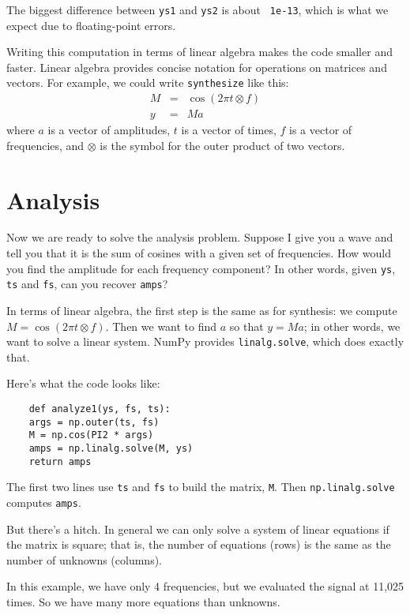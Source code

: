 The biggest difference between {\tt ys1} and {\tt ys2} is about {\tt
	1e-13}, which is what we expect due to floating-point errors.

Writing this computation in terms of linear algebra makes the code
smaller and faster.  Linear algebra
provides concise notation for operations on matrices and vectors.  For
example, we could write {\tt synthesize} like this:
%
\begin{eqnarray*}
	M &=& \cos (2 \pi t \otimes f) \\
	y &=& M a
\end{eqnarray*}
%
where $a$ is a vector of amplitudes,
$t$ is a vector of times, $f$ is a vector of frequencies, and
$\otimes$ is the symbol for the outer product of two vectors.


\section{Analysis}
\label{analysis}

Now we are ready to solve the analysis problem.  Suppose I give you
a wave and tell you that it is the sum of cosines with a given set
of frequencies.  How would you find the amplitude for each frequency
component?  In other words, given {\tt ys}, {\tt ts} and {\tt fs},
can you recover {\tt amps}?

In terms of linear algebra, the first step is the same as for
synthesis: we compute $M = \cos (2 \pi t \otimes f)$.  Then we want
to find $a$ so that $y = M a$; in other words, we want to solve a
linear system.  NumPy provides {\tt linalg.solve}, which does
exactly that.

Here's what the code looks like:

\begin{verbatim}
	def analyze1(ys, fs, ts):
	args = np.outer(ts, fs)
	M = np.cos(PI2 * args)
	amps = np.linalg.solve(M, ys)
	return amps
\end{verbatim}

The first two lines use {\tt ts} and {\tt fs} to build the
matrix, {\tt M}.  Then {\tt np.linalg.solve} computes {\tt amps}.

But there's a hitch.  In general we can only solve a system of linear
equations if the matrix is square; that is, the number of equations
(rows) is the same as the number of unknowns (columns).

In this example, we have only 4 frequencies, but we evaluated the
signal at 11,025 times.  So we have many more equations than unknowns.

